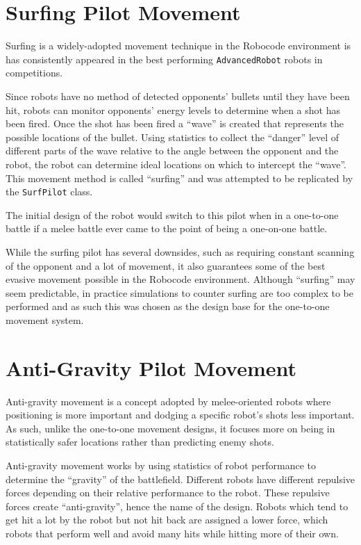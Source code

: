 \documentclass[11pt]{report}
\begin{document}
\section{Surfing Pilot Movement}
Surfing is a widely-adopted movement technique in the Robocode environment is has consistently appeared in the best performing \texttt{AdvancedRobot} robots in competitions.

Since robots have no method of detected opponents' bullets until they have been hit, robots can monitor opponents' energy levels to determine when a shot has been fired. Once the shot has been fired a ``wave'' is created that represents the possible locations of the bullet. Using statistics to collect the ``danger'' level of different parts of the wave relative to the angle between the opponent and the robot, the robot can determine ideal locations on which to intercept the ``wave''. This movement method is called ``surfing'' and was attempted to be replicated by the \texttt{SurfPilot} class.

The initial design of the robot would switch to this pilot when in a one-to-one battle if a melee battle ever came to the point of being a one-on-one battle.

While the surfing pilot has several downsides, such as requiring constant scanning of the opponent and a lot of movement, it also guarantees some of the best evasive movement possible in the Robocode environment. Although ``surfing'' may seem predictable, in practice simulations to counter surfing are too complex to be performed and as such this was chosen as the design base for the one-to-one movement system.

\section{Anti-Gravity Pilot Movement} %
Anti-gravity movement is a concept adopted by melee-oriented robots where positioning is more important and dodging a specific robot's shots less important. As such, unlike the one-to-one movement designs, it focuses more on being in statistically safer locations rather than predicting enemy shots.

Anti-gravity movement works by using statistics of robot performance to determine the ``gravity'' of the battlefield. Different robots have different repulsive forces depending on their relative performance to the robot. These repulsive forces create ``anti-gravity'', hence the name of the design. Robots which tend to get hit a lot by the robot but not hit back are assigned a lower force, which robots that perform well and avoid many hits while hitting more of their own.
\end{document}

